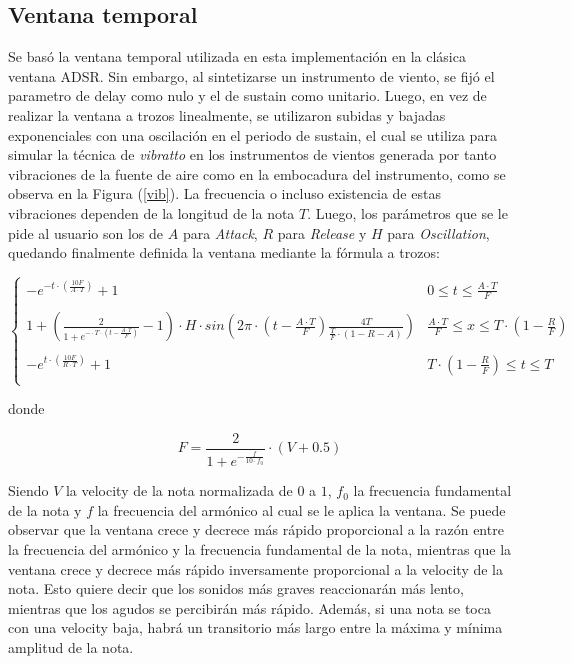 \subsection{Ventana temporal}

Se basó la ventana temporal utilizada en esta implementación en la clásica ventana ADSR. Sin embargo, al sintetizarse un instrumento de viento, se fijó el parametro de delay como nulo y el de sustain como unitario. Luego, en vez de realizar la ventana a trozos linealmente, se utilizaron subidas y bajadas exponenciales con una oscilación en el periodo de sustain, el cual se utiliza para simular la técnica de \textit{vibratto} en los instrumentos de vientos generada por tanto vibraciones de la fuente de aire como en la embocadura del instrumento, como se observa en la Figura (\ref{vib}). La frecuencia o incluso existencia de estas vibraciones dependen de la longitud de la nota $T$. Luego, los parámetros que se le pide al usuario son los de $A$ para \textit{Attack}, $R$ para \textit{Release} y $H$ para \textit{Oscillation}, quedando finalmente definida la ventana mediante la fórmula a trozos:

\begin{equation}
   \left\{
\begin{array}{ll}
      -e^{-t \cdot \left( \frac{10F}{A\cdot T} \right) } + 1 & 0\leq t \leq \frac{A \cdot T}{F} \\
      \\
      1 + \left( \frac{2}{1 + e ^{-\cdot T \cdot \left( t - \frac{A \cdot T}{F} \right) }} - 1 \right) \cdot H \cdot sin\left( 2\pi \cdot \left( t - \frac{A \cdot T}{F} \right) \frac{4T}{\frac{T}{F} \cdot \left( 1 - R - A \right)} \right) & \frac{A \cdot T}{F} \leq x \leq T\cdot (1-\frac{R}{F}) \\
      \\
      -e^{t \cdot \left( \frac{10F}{R\cdot T} \right) } + 1 & T\cdot (1-\frac{R}{F}) \leq t \leq T \\
\end{array} 
\right. 
\end{equation}

donde

\begin{equation}
F = \frac{2}{1 + e^{-\frac{f}{10\cdot f_0}}} \cdot \left( V + 0.5 \right)
\end{equation}

Siendo $V$ la velocity de la nota normalizada de $0$ a $1$, $f_0$ la frecuencia fundamental de la nota y $f$ la frecuencia del armónico al cual se le aplica la ventana. Se puede observar que la ventana crece y decrece más rápido proporcional a la razón entre la frecuencia del armónico y la frecuencia fundamental de la nota, mientras que la ventana crece y decrece más rápido inversamente proporcional a la velocity de la nota. Esto quiere decir que los sonidos más graves reaccionarán más lento, mientras que los agudos se percibirán más rápido. Además, si una nota se toca con una velocity baja, habrá un transitorio más largo entre la máxima y mínima amplitud de la nota.

